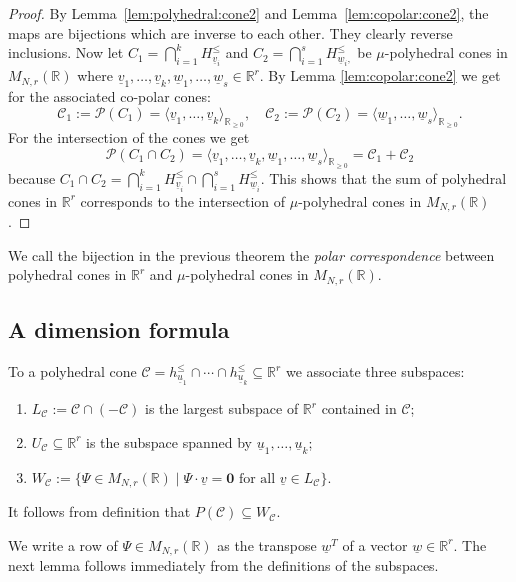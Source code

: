 \documentclass[12pt, a4article]{amsart}   	%
\numberwithin{equation}{section}
\theoremstyle{plain}
\theoremstyle{definition}
\newcommand{\R}{{\mathbb R}}
\newcommand{\mcC}{{\mathcal C}}
\newcommand{\mcP}{{\mathcal P}}
\newcommand{\uu}{{\underline u}}
\newcommand{\uv}{{\underline v}}
\newcommand{\uw}{{\underline w}}
\begin{document}
\begin{proof}
By Lemma~\ref{lem:polyhedral:cone2} and Lemma~\ref{lem:copolar:cone2}, the maps are bijections which are inverse to each other. They clearly reverse inclusions. Now let $C_1 = \bigcap_{i=1}^k H_{\uv_i}^\leq$ and  $C_2 = \bigcap_{i=1}^s H_{\uw_i,}^\leq$ be $\mu$-polyhedral cones in $M_{N,r}(\mathbb{R})$ where $\uv_1,\ldots,\uv_k,\uw_1,\ldots,\uw_s\in \mathbb R^r$. By Lemma \ref{lem:copolar:cone2} we get for the associated co-polar cones:
$$\mcC_1 := \mcP(C_1) = \langle \uv_1,\ldots,\uv_k\rangle_{\R_{\geq 0}},\quad\mcC_2 := \mcP(C_2) = \langle \uw_1,\ldots,\uw_s\rangle_{\R_{\geq 0}}.$$
For the intersection of the cones we get
$$\mcP(C_1\cap C_2) = \langle \uv_1,\ldots,\uv_k,\uw_1,\ldots,\uw_s\rangle_{\R_{\geq 0}} = \mcC_1 + \mcC_2$$
because $C_1\cap C_2 = \bigcap_{i=1}^k H_{\uv_i}^\leq \cap \bigcap_{i=1}^s H_{\uw_i}^\leq$. This shows that the sum of polyhedral cones in $\mathbb R^r$ corresponds to the intersection of $\mu$-polyhedral cones in $M_{N,r}(\mathbb R)$.
\end{proof}

We call the  bijection in the previous theorem the \emph{polar correspondence} between polyhedral
cones in $\mathbb R^r$ and  $\mu$-polyhedral cones in $M_{N,r}(\mathbb R)$.


\subsection{A dimension formula}

To a polyhedral cone $\mcC=h_{ {\uu_1}}^\leq\cap \cdots\cap h_{ {\uu_k}}^\leq \subseteq\R^r$ we associate  
three subspaces:
\begin{enumerate}
\item $L_\mcC := \mcC\cap(-\mcC)$ is the largest subspace of $\R^r$ contained in $\mcC$;
\item $U_\mcC\subseteq \R^r$ is the subspace spanned by $\uu_1,\ldots,\uu_k$;
\item $W_\mcC:=\{\Psi\in M_{N,r}(\R)\mid \Psi\cdot\uv = \mathbf 0 \text{ for all }\uv\in L_\mcC\}$.
\end{enumerate} 
It follows from definition that $P(\mcC)\subseteq  W_\mcC$. 

We write a row of $\Psi\in M_{N,r}(\R)$ as the transpose
$\uw^T$ of a vector $\uw\in \R^r$. The next lemma follows immediately from the definitions of the subspaces.
\end{document}
